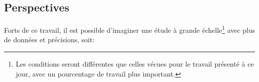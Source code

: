 









  



\subsection{Perspectives}
Forts de ce travail, il est possible d'imaginer une étude à  grande
échelle\footnote{Les conditions seront différentes que celles vécues pour le
travail présenté à ce jour, avec un pourcentage de travail plus
important.} avec plus de données et précisions, soit: 

